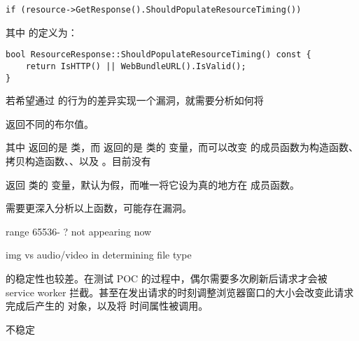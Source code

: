 \begin{lstlisting}
if (resource->GetResponse().ShouldPopulateResourceTiming())
\end{lstlisting}

其中  的定义为：

\begin{lstlisting}
bool ResourceResponse::ShouldPopulateResourceTiming() const {
    return IsHTTP() || WebBundleURL().IsValid();
}
\end{lstlisting}

若希望通过  的行为的差异实现一个漏洞，就需要分析如何将

 返回不同的布尔值。

其中  返回的是  类，而  返回的是  类的  变量，而可以改变  的成员函数为构造函数、拷贝构造函数、、以及 。目前没有

 返回  类的  变量，默认为假，而唯一将它设为真的地方在  成员函数。

需要更深入分析以上函数，可能存在漏洞。

range 65536- ? not appearing now

img vs audio/video in determining file type



 的稳定性也较差。在测试 POC 的过程中，偶尔需要多次刷新后请求才会被 service worker 拦截。甚至在发出请求的时刻调整浏览器窗口的大小会改变此请求完成后产生的  对象，以及将  时间属性被调用。


不稳定

